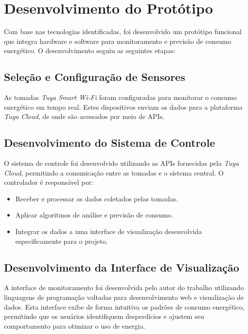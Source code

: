 \section{Desenvolvimento do Protótipo}

Com base nas tecnologias identificadas, foi desenvolvido um protótipo funcional que integra hardware e software para monitoramento e previsão de consumo energético. O desenvolvimento seguiu as seguintes etapas:

\subsection{Seleção e Configuração de Sensores}

As tomadas \textit{Tuya Smart Wi-Fi} foram configuradas para monitorar o consumo energético em tempo real. Estes dispositivos enviam os dados para a plataforma \textit{Tuya Cloud}, de onde são acessados por meio de APIs.

\subsection{Desenvolvimento do Sistema de Controle}

O sistema de controle foi desenvolvido utilizando as APIs fornecidas pela \textit{Tuya Cloud}, permitindo a comunicação entre as tomadas e o sistema central. O controlador é responsável por:

\begin{itemize}
    \item Receber e processar os dados coletados pelas tomadas.
    \item Aplicar algoritmos de análise e previsão de consumo.
    \item Integrar os dados a uma interface de visualização desenvolvida especificamente para o projeto.
\end{itemize}

\subsection{Desenvolvimento da Interface de Visualização}

A interface de monitoramento foi desenvolvida pelo autor do trabalho utilizando linguagens de programação voltadas para desenvolvimento web e visualização de dados. Esta interface exibe de forma intuitiva os padrões de consumo energético, permitindo que os usuários identifiquem desperdícios e ajustem seu comportamento para otimizar o uso de energia.

